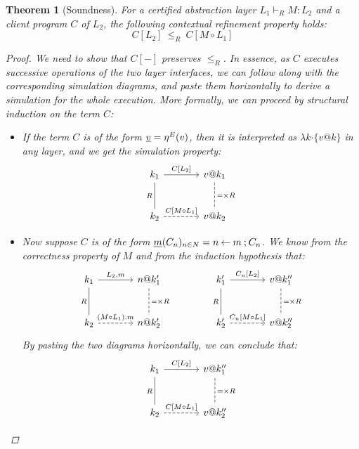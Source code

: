 \documentclass[11pt,oneside,draft]{book}
\newtheorem{theorem}{Theorem}[chapter]
\theoremstyle{definition}
\newcommand{\bdot}{\boldsymbol{\cdot}}
\newcommand{\ul}[1]{%
  \underline{\smash{#1}}
}
\begin{document}
\begin{theorem}[Soundness] %
For a certified abstraction layer $L_1 \vdash_R M : L_2$
and a client program $C$ of $L_2$,
the following \emph{contextual refinement} property holds:
\[
  C[L_2] \: \le_R \: C[M \circ L_1]
\]
\begin{proof}
We need to show that $C[-]$ preserves $\le_R$.
In essence,
as $C$ executes successive operations of
the two layer interfaces,
we can follow along with the corresponding
simulation diagrams,
and paste them horizontally to derive a simulation
for the whole execution.
More formally,
we can proceed
by structural induction on the term $C$:
\begin{itemize}
  \item
    If the term $C$ is of the form $\ul{v} = \eta^E(v)$,
    then it is interpreted as $\lambda k \bdot \{v@k\}$
    in any layer,
    and we get the simulation property:
    \[
      \begin{tikzcd}[sep=large]
        k_1 \ar[r, "{C[L_2]}"] \ar[d, "R"', dash] &
        v@k_1 \ar[d, "{=} \times R", dash, dashed] \\
        k_2 \ar[r, "{C[M \circ L_1]}", dashed] &
        v@k_2
      \end{tikzcd}
    \]
  \item
    Now suppose $C$ is of the form
    $\ul{m}(C_n)_{n \in N} = n \mathbin\leftarrow m \mathbin; C_n$.
    We know from the correctness property of $M$ and
    from the induction hypothesis that:
    \[
      \begin{tikzcd}[sep=large]
        k_1 \ar[r, "L_2.m"] \ar[d, "R"', dash] &
        n@k_1' \ar[d, "{=} \times R", dash, dashed] \\
        k_2 \ar[r, "(M \circ L_1).m", dashed] &
        n@k_2'
      \end{tikzcd}
      \qquad \qquad
      \begin{tikzcd}[sep=large]
        k_1' \ar[r, "{C_n[L_2]}"] \ar[d, "R"', dash] &
        v@k_1'' \ar[d, "{=} \times R", dash, dashed] \\
        k_2' \ar[r, "{C_n[M \circ L_1]}", dashed] &
        v@k_2''
      \end{tikzcd}
    \]
    By pasting the two diagrams horizontally,
    we can conclude that:
    \[
      \begin{tikzcd}[sep=large]
        k_1 \ar[r, "{C[L_2]}"] \ar[d, "R"', dash] &
        v@k_1'' \ar[d, "{=} \times R", dash, dashed] \\
        k_2 \ar[r, "{C[M \circ L_1]}", dashed] &
        v@k_2''
      \end{tikzcd}
    \]
\end{itemize}
\end{proof}
\end{theorem}
\end{document}
